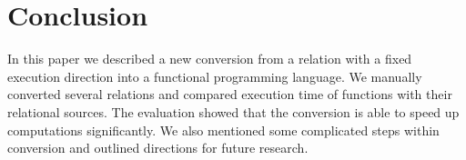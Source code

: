 \section{Conclusion}

In this paper we described a new conversion from a \mk relation with a fixed execution direction into a functional programming language.
We manually converted several \mk relations and compared execution time of functions with their relational sources.
The evaluation showed that the conversion is able to speed up computations significantly.
We also mentioned some complicated steps within conversion and outlined directions for future research.
